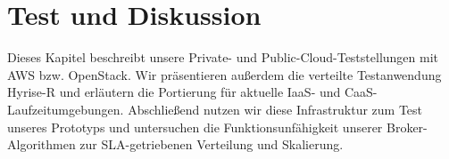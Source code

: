 \chapter{Test und Diskussion}

Dieses Kapitel beschreibt unsere Private- und Public-Cloud-Teststellungen mit AWS bzw. OpenStack. Wir präsentieren außerdem die verteilte Testanwendung Hyrise-R und erläutern die Portierung für aktuelle IaaS- und CaaS-Laufzeitumgebungen. Abschließend nutzen wir diese Infrastruktur zum Test unseres Prototyps und untersuchen die Funktionsunfähigkeit unserer Broker-Algorithmen zur SLA-getriebenen Verteilung und Skalierung.











